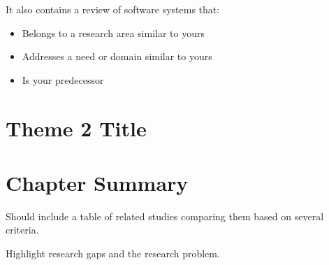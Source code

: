 It also contains a review of software systems that:
%
%
\begin{itemize}
   \item Belongs to a research area similar to yours
   \item Addresses a need or domain similar to yours
   \item Is your predecessor
\end{itemize}

\section{Theme 2 Title}

\section{Chapter Summary}
Should include a table of related studies comparing them based on several criteria.

Highlight research gaps and the research problem.













